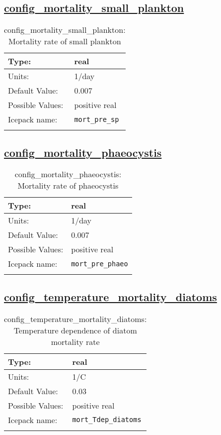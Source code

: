 \subsection[config\_mortality\_small\_plankton]{\hyperref[sec:nm_tab_biogeochemistry]{config\_mortality\_small\_plankton}}
\label{subsec:nm_sec_config_mortality_small_plankton}
\begin{center}
\begin{longtable}{| p{2.0in} || p{4.0in} |}
    \hline
    Type: & real \\
    \hline
    Units: & \si{1/day} \\
    \hline
    Default Value: & 0.007 \\
    \hline
    Possible Values: & positive real \\
    \hline
    Icepack name: & \verb+mort_pre_sp+ \\
    \hline
    \caption{config\_mortality\_small\_plankton: Mortality rate of small plankton}
\end{longtable}
\end{center}
\subsection[config\_mortality\_phaeocystis]{\hyperref[sec:nm_tab_biogeochemistry]{config\_mortality\_phaeocystis}}
\label{subsec:nm_sec_config_mortality_phaeocystis}
\begin{center}
\begin{longtable}{| p{2.0in} || p{4.0in} |}
    \hline
    Type: & real \\
    \hline
    Units: & \si{1/day} \\
    \hline
    Default Value: & 0.007 \\
    \hline
    Possible Values: & positive real \\
    \hline
    Icepack name: & \verb+mort_pre_phaeo+ \\
    \hline
    \caption{config\_mortality\_phaeocystis: Mortality rate of phaeocystis}
\end{longtable}
\end{center}
\subsection[config\_temperature\_mortality\_diatoms]{\hyperref[sec:nm_tab_biogeochemistry]{config\_temperature\_mortality\_diatoms}}
\label{subsec:nm_sec_config_temperature_mortality_diatoms}
\begin{center}
\begin{longtable}{| p{2.0in} || p{4.0in} |}
    \hline
    Type: & real \\
    \hline
    Units: & \si{1/C} \\
    \hline
    Default Value: & 0.03 \\
    \hline
    Possible Values: & positive real \\
    \hline
    Icepack name: & \verb+mort_Tdep_diatoms+ \\
    \hline
    \caption{config\_temperature\_mortality\_diatoms: Temperature dependence of diatom mortality rate}
\end{longtable}
\end{center}
